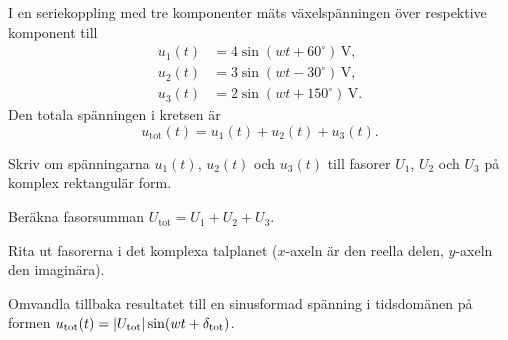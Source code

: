 I en seriekoppling med tre komponenter mäts växelspänningen över respektive komponent till
\begin{align*}
  u_1(t) &= 4\sin(wt + 60^{\circ})\,\text{V}, \\
  u_2(t) &= 3\sin(wt - 30^{\circ})\,\text{V}, \\
  u_3(t) &= 2\sin(wt + 150^{\circ})\,\text{V}.
\end{align*}
Den totala spänningen i kretsen är
\[
  u_{\text{tot}}(t) = u_1(t) + u_2(t) + u_3(t).
\]
\begin{parts}
  \item Skriv om spänningarna $u_1(t)$, $u_2(t)$ och $u_3(t)$ till fasorer $U_1$, $U_2$ och
    $U_3$ på komplex rektangulär form.
  \item Beräkna fasorsumman $U_{\text{tot}} = U_1 + U_2 + U_3$.
  \item Rita ut fasorerna i det komplexa talplanet ($x$-axeln är den reella delen, $y$-axeln den
    imaginära).
  \item Omvandla tillbaka resultatet till en sinusformad spänning i tidsdomänen på formen
    $u_{\text{tot}}(t) = \lvert U_{\text{tot}}\rvert \sin(wt + \delta_{\text{tot}})$.
\end{parts}
